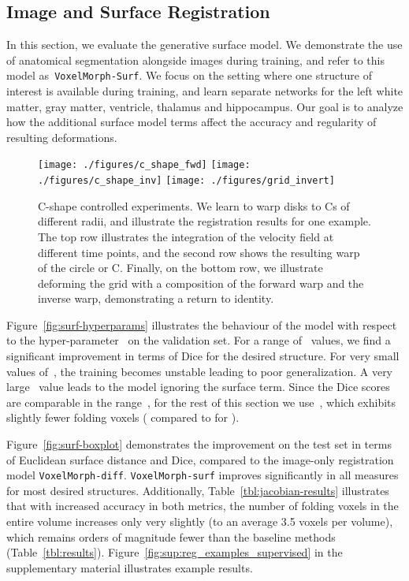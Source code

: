 \documentclass{article}
\begin{document}
\subsection{Image and Surface Registration}


	
	In this section, we evaluate the generative surface model. We demonstrate the use of anatomical segmentation alongside images during training, and refer to this model as~\verb|VoxelMorph-Surf|. We focus on the setting where one structure of interest is available during training, and learn separate networks for the left white matter, gray matter, ventricle, thalamus and hippocampus. Our goal is to analyze how the additional surface model terms affect the accuracy and regularity of resulting deformations.
	






\begin{figure*}[t!]
	\centering
	\texttt{[image: ./figures/c\_shape\_fwd]}
	\vspace{0.3cm}
	\texttt{[image: ./figures/c\_shape\_inv]}
	\texttt{[image: ./figures/grid\_invert]}
	\hfill
	\caption{\color{blue} C-shape controlled experiments. We learn to warp disks to Cs of different radii, and illustrate the registration results for one example. The top row illustrates the integration of the velocity field at different time points, and the second row shows the resulting warp of the circle or C. Finally, on the bottom row, we illustrate deforming the grid with a composition of the forward warp and the inverse warp, demonstrating a return to identity.}
	\label{fig:C_shape}
\end{figure*}





	
	Figure~\ref{fig:surf-hyperparams} illustrates the behaviour of the model with respect to the hyper-parameter~ on the validation set. For a range of~ values, we find a significant improvement in terms of Dice for the desired structure. For very small values of~, the training becomes unstable leading to poor generalization. A very large~ value leads to the model ignoring the surface term. Since the Dice scores are comparable in the range~, for the rest of this section we use~, which exhibits slightly fewer folding voxels ( compared to  for ).
	
	Figure~\ref{fig:surf-boxplot} demonstrates the improvement on the test set in terms of Euclidean surface distance and Dice, compared to the image-only registration model \verb|VoxelMorph-diff|. \verb|VoxelMorph-surf| improves significantly in all measures for most desired structures. Additionally, Table~\ref{tbl:jacobian-results} illustrates that with increased accuracy in both metrics, the number of folding voxels in the entire volume increases only very slightly (to an average 3.5 voxels per volume), which remains orders of magnitude fewer than the baseline methods (Table~\ref{tbl:results}). Figure~\ref{fig:sup:reg_examples_supervised} in the supplementary material illustrates example results.
	
\end{document}
